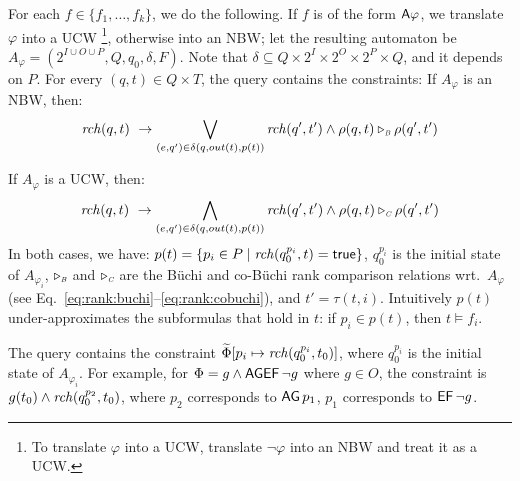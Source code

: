 
\-[(2)] For each $f \in \{f_1, \dots, f_k\}$,
we do the following.
If $f$ is of the form ${\operatorname{\mathsf{A}}} \varphi$, we translate $\varphi$ into a UCW%
\footnote{To translate $\varphi$ into a UCW,
          translate $\neg\varphi$ into an NBW and treat it as a UCW.},
otherwise into an NBW;
let the resulting automaton be
$A_\varphi = (2^{I \cup O \cup P},Q,q_0,\delta,F)$.
Note that $\delta \subseteq Q \times 2^I \times 2^O \times 2^P \times Q$,
and it depends on $P$.
For every $(q,t) \in Q \times T$, the query contains the constraints:
\li
\-[(2a)] If $A_\varphi$ is an NBW, then:
\begin{equation*}
\mathit{rch}(q,t) ~\rightarrow
\bigvee_{(e, q') \in \delta(q,out(t),p(t))}
\mathit{rch}(q',t') \land \rho(q,t)\triangleright_{\textit{\tiny B}} \rho(q',t')
\end{equation*}

\-[(2b)] If $A_\varphi$ is a UCW, then:
\begin{equation*}
\reach(q,t) ~\impl
\bigwedge_{(e, q') \in \delta(q,out(t),p(t))} %
\reach(q',t') \land \rank(q,t)\triangleright_{\textit{\tiny C}} \rank(q',t')
\end{equation*}
\il
In both cases, we have:
  $p(t)=\{p_i \in P \mid \mathit{rch}(q_0^{p_i},t)=\textsf{true} \}$,
  $q_0^{p_i}$ is the initial state of  $A_{\varphi_i}$,
  $\triangleright_{\textit{\tiny B}}$ and $\triangleright_{\textit{\tiny C}}$
  are the B\"uchi and co-B\"uchi rank comparison relations
  wrt.\ $A_\varphi$ (see Eq.~\ref{eq:rank:buchi}--\ref{eq:rank:cobuchi}),
  and $t' = \tau(t,i)$.
  Intuitively
  $p(t)$ under-approximates the subformulas that hold in $t$:
  if $p_i \in p(t)$, then $t \models f_i$.

\-[(3)] The query contains the constraint
       $\widetilde\Phi[p_i \mapsto \mathit{rch}(q_0^{p_i},t_0)]$,
       where $q_0^{p_i}$ is the initial state of $A_{\varphi_i}$.
       For example,
       for $\Phi = g \land \operatorname{\mathsf{AGEF}} \neg g$ where $g \in O$,
       the constraint is $g(t_0) \land \mathit{rch}(q_0^{p_2}, t_0)$,
       where
       $p_2$ corresponds to $\operatorname{\mathsf{AG}} p_1$,
       $p_1$ corresponds to $\operatorname{\mathsf{EF}} \neg g$.
\il


